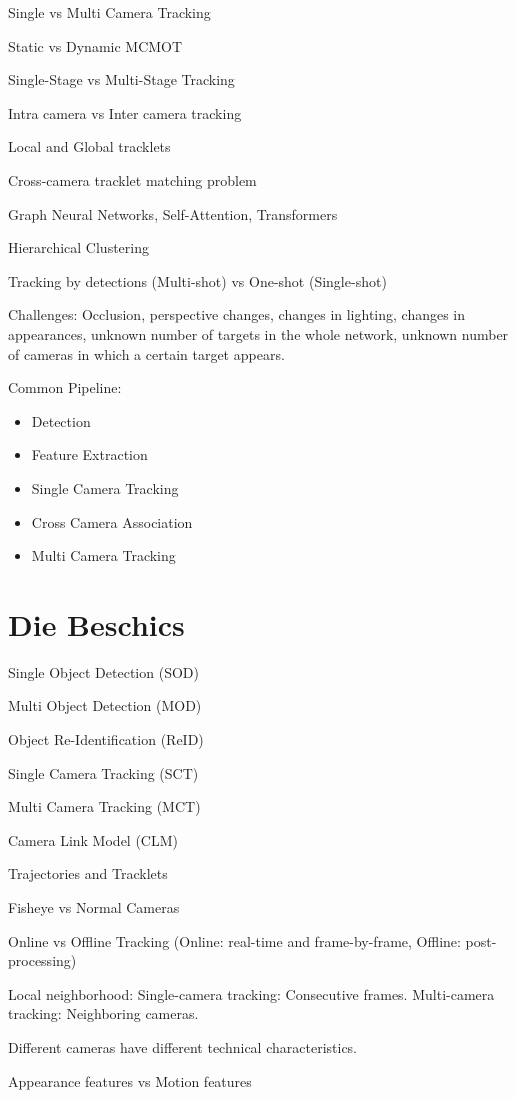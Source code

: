 Single vs Multi Camera Tracking

Static vs Dynamic MCMOT

Single-Stage vs Multi-Stage Tracking

Intra camera vs Inter camera tracking

Local and Global tracklets

Cross-camera tracklet matching problem

Graph Neural Networks, Self-Attention, Transformers

Hierarchical Clustering

Tracking by detections (Multi-shot) vs One-shot (Single-shot)

Challenges: Occlusion, perspective changes, changes in lighting, changes in appearances, unknown number of targets in the whole network, unknown number of cameras in which a certain target appears.

Common Pipeline:
\begin{itemize}
    \item Detection
    \item Feature Extraction
    \item Single Camera Tracking
    \item Cross Camera Association
    \item Multi Camera Tracking
\end{itemize}
\section{Die Beschics}

Single Object Detection (SOD)

Multi Object Detection (MOD)

Object Re-Identification (ReID)

Single Camera Tracking (SCT)

Multi Camera Tracking (MCT)

Camera Link Model (CLM)

Trajectories and Tracklets

Fisheye vs Normal Cameras

Online vs Offline Tracking (Online: real-time and frame-by-frame, Offline: post-processing)

Local neighborhood:
Single-camera tracking: Consecutive frames.
Multi-camera tracking: Neighboring cameras.

Different cameras have different technical characteristics.

Appearance features vs Motion features

